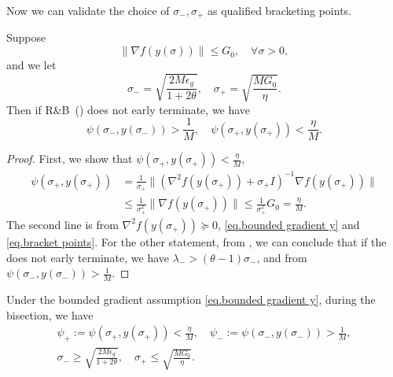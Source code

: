 \documentclass{article}
\begin{document}
Now we can validate the choice of $\sigma_-,\sigma_+$ as qualified bracketing points.
\begin{lemma}
    \label{lem.bracketing points}
    Suppose
    \begin{equation}\label{eq.bounded gradient y}
        \|\nabla f(y(\sigma))\|\leq G_0, \quad \forall \sigma>0,
    \end{equation}
    and we let
    \begin{equation}
        \label{eq.bracket points}
        \sigma_- = \sqrt{\frac{2M\epsilon_g}{1+2\theta}}, \quad \sigma_+ = \sqrt{\frac{MG_0}{\eta}}.
    \end{equation}
    Then if \textnormal{R\&B}~() does not early terminate, we have
    \begin{equation*}
        \psi\left (\sigma_-,y(\sigma_-)\right) >\frac{1}{M}, \quad \psi\left (\sigma_+,y(\sigma_+)\right) <\frac{\eta}{M}.
    \end{equation*}
\end{lemma}
\begin{proof}
    First, we show that $\psi(\sigma_+,y(\sigma_+))<\frac{\eta}{M}$,
    \begin{equation*}
        \begin{aligned}
            \psi(\sigma_+,y(\sigma_+)) & = \frac{1}{\sigma_+} \|(\nabla^2 f(y(\sigma_+))+\sigma_+ I)^{-1}\nabla f(y(\sigma_+))\|            \\
                                       & \leq \frac{1}{\sigma_+^2}\|\nabla f(y(\sigma_+))\| \leq \frac{1}{\sigma_+^2} G_0 = \frac{\eta}{M}.
        \end{aligned}
    \end{equation*}
    The second line is from $\nabla^2 f(y(\sigma_+))\succeq 0$, \eqref{eq.bounded gradient y} and \eqref{eq.bracket points}. For the other statement, from , we can conclude that if the  does not early terminate, we have $\lambda_- > (\theta-1)\sigma_-$, and from  $\psi(\sigma_-,y(\sigma_-))>\frac{1}{M}.$
\end{proof}
Under the bounded gradient assumption \eqref{eq.bounded gradient y}, during the bisection, we have
\begin{gather}
    \label{eq.bisection condition}
    \psi_+:=\psi(\sigma_+,y(\sigma_+))<\frac{\eta}{M}, \quad \psi_-:=\psi(\sigma_-,y(\sigma_-))>\frac{1}{M},\\
    \label{eq.bracket points condition} \sigma_- \geq \sqrt{\frac{2M\epsilon_g}{1+2\theta}}, \quad \sigma_+ \leq \sqrt{\frac{MG_0}{\eta}}.
\end{gather}
\end{document}
